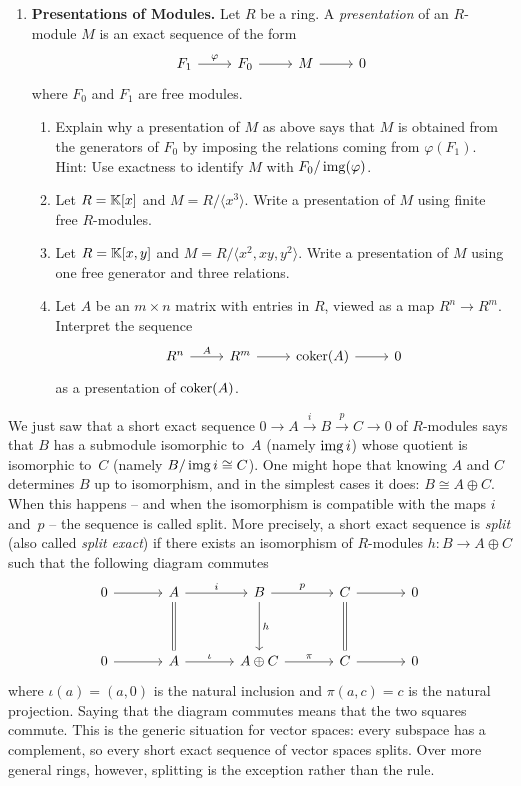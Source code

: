 \documentclass[12pt,reqno]{amsart}
\begin{document}
\begin{enumerate}[leftmargin=*, series=problems]
\item \textbf{Presentations of Modules.} Let $R$ be a ring. A \emph{presentation} of an $R$-module $M$ is an exact sequence of the form
\[
\begin{tikzcd}
F_1 \arrow[r, "\varphi"] & F_0 \arrow[r] & M \arrow[r] & 0
\end{tikzcd}
\]
where $F_0$ and $F_1$ are free modules.
\begin{enumerate}
\item  Explain why a presentation of $M$ as above says that $M$ is obtained from the generators of $F_0$ by imposing the relations coming from $\varphi(F_1)$. Hint: Use exactness to identify $M$ with $F_0/\operatorname{img}(\varphi)$.
\item Let $R=\mathbb{K}[x]$ and $M=R/\langle x^3\rangle$. Write a presentation of $M$ using finite free $R$-modules.
\item Let $R=\mathbb{K}[x,y]$ and $M=R/\langle x^2,xy,y^2\rangle$. Write a presentation of $M$ using one free generator and three relations.
\item Let $A$ be an $m\times n$ matrix with entries in $R$, viewed as a map $R^n\to R^m$. Interpret the sequence
\[
\begin{tikzcd}
R^n \arrow[r, "A"] & R^m \arrow[r] & \coker(A) \arrow[r] & 0
\end{tikzcd}
\]
as a presentation of $\operatorname{coker}(A)$.
\end{enumerate}
\end{enumerate}

\hrulefill

We just saw that a short exact sequence $0\to A\xrightarrow{i}B\xrightarrow{p}C\to 0$ of $R$-modules says that $B$ has a submodule isomorphic to~$A$ (namely $\operatorname{img} i$) whose quotient is isomorphic to~$C$ (namely $B/\operatorname{img} i\cong C$). One might hope that knowing $A$ and $C$ determines $B$ up to isomorphism, and in the simplest cases it does: $B\cong A\oplus C$. When this happens -- and when the isomorphism is compatible with the maps $i$ and~$p$ -- the sequence is called split. More precisely, a short exact sequence is \emph{split} (also called \emph{split exact}) if there exists an isomorphism of $R$-modules $h:B \to A\oplus C$ such that the following diagram commutes
\[
\begin{tikzcd}[row sep = 3.5em, column sep = 3.5em]
0 \arrow[r] & A \arrow[r, "i"] \arrow[d, equals] & B \arrow[r, "p"] \arrow[d,"h"]& C \arrow[r] \arrow[d, equals] & 0 \\
0 \arrow[r] & A \arrow[r, "\iota"] & A\oplus C \arrow[r, "\pi"] & C \arrow[r] & 0
\end{tikzcd}
\]
where $\iota(a)=(a,0)$ is the natural inclusion and $\pi(a,c)=c$ is the natural projection. Saying that the diagram commutes means that the two squares commute. This is the generic situation for vector spaces: every subspace has a complement, so every short exact sequence of vector spaces splits.  Over more general rings, however, splitting is the exception rather than the rule. 
\end{document}
